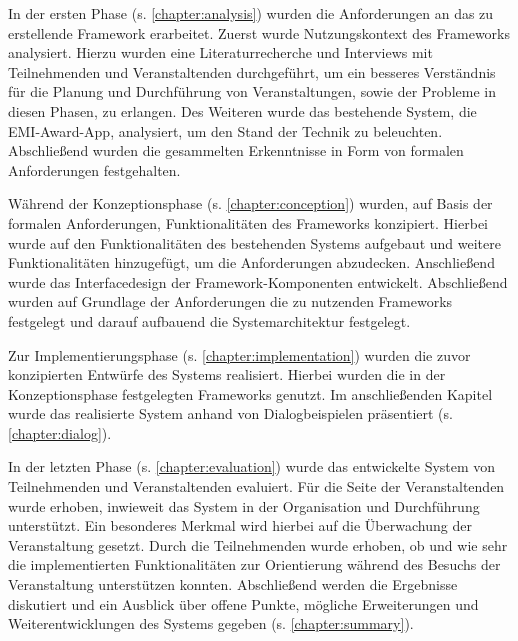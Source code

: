 In der ersten Phase (s. \autoref{chapter:analysis}) wurden die Anforderungen an das zu erstellende Framework
erarbeitet. Zuerst wurde Nutzungskontext des Frameworks analysiert. Hierzu
wurden eine Literaturrecherche und Interviews mit Teilnehmenden und
Veranstaltenden durchgeführt, um ein besseres Verständnis für die Planung und
Durchführung von Veranstaltungen, sowie der Probleme in diesen Phasen, zu
erlangen. Des Weiteren wurde das bestehende System, die EMI-Award-App,
analysiert, um den Stand der Technik zu beleuchten. Abschließend wurden die
gesammelten Erkenntnisse in Form von formalen Anforderungen festgehalten.

Während der Konzeptionsphase (s. \autoref{chapter:conception}) wurden, auf Basis der formalen Anforderungen,
Funktionalitäten des Frameworks konzipiert. Hierbei wurde auf den
Funktionalitäten des bestehenden Systems aufgebaut und weitere Funktionalitäten
hinzugefügt, um die Anforderungen abzudecken. Anschließend wurde das
Interfacedesign der Frame\-work-Kom\-po\-nen\-ten entwickelt. Abschließend
wurden auf Grundlage der Anforderungen die zu nutzenden Frameworks festgelegt
und darauf aufbauend die Systemarchitektur festgelegt.

Zur Implementierungsphase (s. \autoref{chapter:implementation}) wurden die zuvor konzipierten Entwürfe des Systems
realisiert. Hierbei wurden die in der Konzeptionsphase festgelegten Frameworks
genutzt. Im anschließenden Kapitel wurde das realisierte System anhand von
Dialogbeispielen präsentiert (s. \autoref{chapter:dialog}).

In der letzten Phase (s. \autoref{chapter:evaluation}) wurde das entwickelte System von Teilnehmenden und
Veranstaltenden evaluiert. Für die Seite der Veranstaltenden wurde erhoben,
inwieweit das System in der Organisation und Durchführung unterstützt. Ein
besonderes Merkmal wird hierbei auf die Überwachung der Veranstaltung gesetzt.
Durch die Teilnehmenden wurde erhoben, ob und wie sehr die implementierten
Funktionalitäten zur Orientierung während des Besuchs der Veranstaltung
unterstützen konnten. Abschließend werden die Ergebnisse diskutiert und ein
Ausblick über offene Punkte, mögliche Erweiterungen und Weiterentwicklungen des
Systems gegeben (s. \autoref{chapter:summary}).


